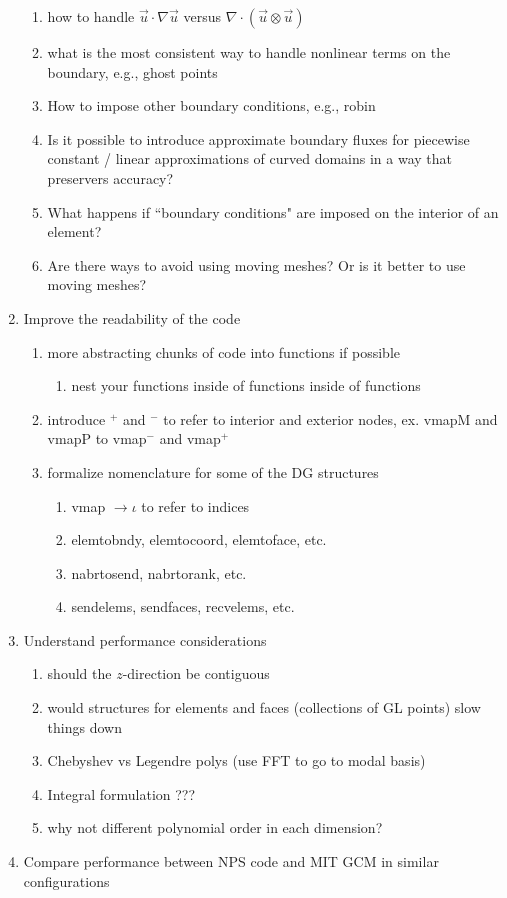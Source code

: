 \documentclass{article}
\begin{document}
\begin{enumerate}
\begin{enumerate}
        \item how to handle $\vec u \cdot \nabla \vec u$ versus $\nabla \cdot (\vec u \otimes \vec u)$
        \item what is the most consistent way to handle nonlinear terms on the boundary, e.g., ghost points
        \item How to impose other boundary conditions, e.g., robin
        \item  Is it possible to introduce approximate boundary fluxes for piecewise constant / linear approximations of curved domains in a way that preservers accuracy?
        \item What happens if ``boundary conditions" are imposed on the interior of an element?
        \item Are there ways to avoid using moving meshes? Or is it better to use moving meshes?
    \end{enumerate}
    \item Improve the readability of the code
    \begin{enumerate}
        \item more abstracting chunks of code into functions if possible
        \begin{enumerate}
            \item nest your functions inside of functions inside of functions
        \end{enumerate}
        \item introduce $^+$ and $^-$ to refer to interior and exterior nodes, ex. vmapM and vmapP to vmap$^-$ and vmap$^+$
        \item formalize nomenclature for some of the DG structures
        \begin{enumerate}
            \item vmap $\rightarrow \iota$ to refer to indices
            \item elemtobndy, elemtocoord, elemtoface, etc.
            \item nabrtosend, nabrtorank, etc.
            \item sendelems, sendfaces, recvelems, etc.
        \end{enumerate}
    \end{enumerate}
    \item Understand performance considerations 
    \begin{enumerate}
        \item should the $z$-direction be contiguous
        \item would structures for elements and faces (collections of GL points) slow things down
        \item Chebyshev vs Legendre polys (use FFT to go to modal basis)
        \item Integral formulation ???
        \item why not different polynomial order in each dimension?
    \end{enumerate}
    \item Compare performance between NPS code and MIT GCM in similar configurations
\end{enumerate}
\end{document}
